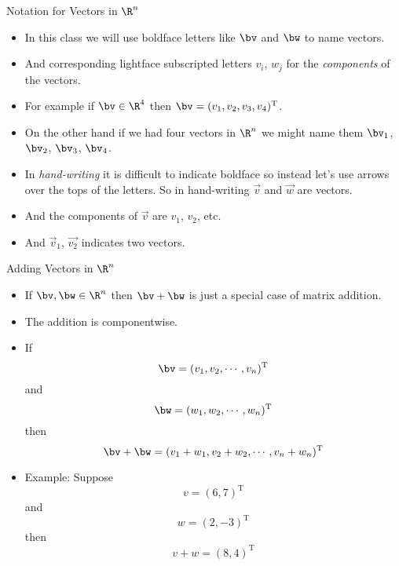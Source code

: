 \documentclass{beamer}
\begin{document}
\begin{frame}{Notation for Vectors in $\R^n$}

\begin{itemize}
\item In this class we will use boldface letters like $\bv$ and $\bw$ to name
vectors.
\item And corresponding lightface subscripted letters $v_i$, $w_j$ for the
\emph{components} of the vectors.
\item For example if $\bv\in\R^4$ then $\bv=(v_1, v_2, v_3, v_4)^{\text{T}}$.
\item On the other hand if we had four vectors in $\R^n$ we might name them
$\bv_1$, $\bv_2$, $\bv_3$, $\bv_4$.
\item In \emph{hand-writing} it is difficult to indicate boldface so instead
let's use arrows over the tops of the letters. So in hand-writing
$\vec{v}$ and $\vec{w}$ are vectors.
\item And the components of $\vec{v}$ are $v_1$, $v_2$, etc.
\item And $\vec{v}_1$, $\vec{v_2}$ indicates two vectors.
\end{itemize}

\end{frame}

\begin{frame}{Adding Vectors in $\R^n$}

\begin{itemize}
\item If $\bv, \bw \in \R^n$ then $\bv+\bw$ is just a special case of matrix addition.
\item The addition is componentwise.
\item If $$\bv=(v_1, v_2, \cdots , v_n)^{\text{T}}$$ and $$\bw=(w_1, w_2, \cdots, w_n)^{\text{T}}$$
then $$\bv+\bw = (v_1 + w_1, v_2 + w_2, \cdots, v_n + w_n)^{\text{T}}$$
\item Example: Suppose $$v = (6, 7)^{\text{T}}$$ and $$w=(2, -3)^{\text{T}}$$ then
$$v+w=(8, 4)^{\text{T}}$$
\end{itemize}

\end{frame}

\beamerdefaultoverlayspecification{}
\end{document}
